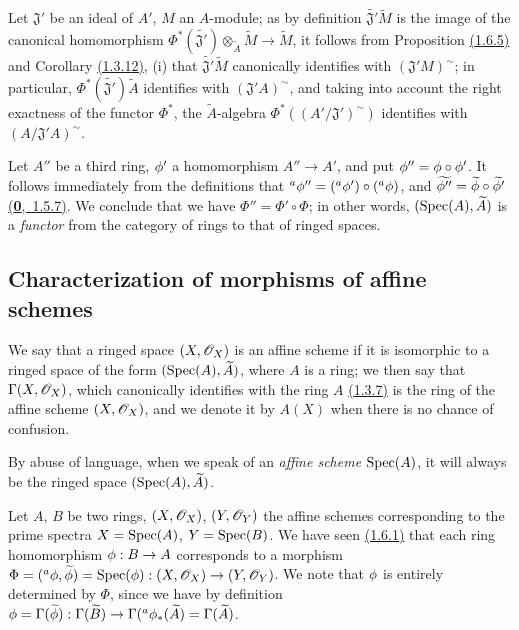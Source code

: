 \begin{env}[1.6.9]
\label{env-1.1.6.9}
Let $\mathfrak{J}'$ be an ideal of $A'$, $M$ an $A$-module; as by definition
$\widetilde{\mathfrak{J}'}\widetilde{M}$ is the image of the canonical homomorphism
$\Phi^*(\widetilde{\mathfrak{J}'})\otimes_{\widetilde{A}}\widetilde{M}\to\widetilde{M}$, it
follows from Proposition \hyperref[prop-1.1.6.5]{(1.6.5)} and
Corollary \hyperref[cor-1.1.3.12]{(1.3.12)}, (i) that
$\widetilde{\mathfrak{J}'}\widetilde{M}$ canonically identifies with $(\mathfrak{J}' M)^\sim$;
in particular, $\Phi^*(\widetilde{\mathfrak{J}'})\widetilde{A}$ identifies with
$(\mathfrak{J}' A)^\sim$, and taking into account the right exactness of the functor $\Phi^*$,
the $\widetilde{A}$-algebra $\Phi^*((A'/\mathfrak{J}')^\sim)$ identifies with
$(A/\mathfrak{J}' A)^\sim$.
\end{env}

\begin{env}[1.6.10]
\label{env-1.1.6.10}
Let $A''$ be a third ring, $\phi'$ a homomorphism $A''\to A'$, and put
$\phi''=\phi\circ\phi'$. It follows immediately from the definitions that
${}^a\phi''=({}^a\phi')\circ({}^a\phi)$, and
$\widetilde{\phi''}=\widetilde{\phi}\circ\widetilde{\phi'}$ \hyperref[env-0.1.5.7]{(\textbf{0},~1.5.7)}. We conclude
that we have $\Phi''=\Phi'\circ\Phi$; in other words, $({\mathop{\mathrm{Spec}}\nolimits}(A),\widetilde{A})$ is a
{\it functor} from the category of rings to that of ringed spaces.
\end{env}

\subsection{Characterization of morphisms of affine schemes}
\label{subsection-morphisms-affine-schemes}

\begin{defn}[1.7.1]
\label{defn-1.1.7.1}
We say that a ringed space $(X,\mathscr{O}_X)$ is an affine scheme if it is isomorphic to a ringed
space of the form $({\mathop{\mathrm{Spec}}\nolimits}(A),\widetilde{A})$, where $A$ is a ring; we then say that
$\Gamma(X,\mathscr{O}_X)$, which canonically identifies with the ring $A$ \hyperref[thm-1.1.3.7]{(1.3.7)} is the
ring of the affine scheme $(X,\mathscr{O}_X)$, and we denote it by $A(X)$ when there is no chance of
confusion.
\end{defn}

By abuse of language, when we speak of an {\it affine scheme ${\mathop{\mathrm{Spec}}\nolimits}(A)$}, it will always be
the ringed space $({\mathop{\mathrm{Spec}}\nolimits}(A),\widetilde{A})$.

\begin{env}[1.7.2]
\label{env-1.1.7.2}
Let $A$, $B$ be two rings, $(X,\mathscr{O}_X)$, $(Y,\mathscr{O}_Y)$ the affine schemes corresponding to
the prime spectra $X={\mathop{\mathrm{Spec}}\nolimits}(A)$, $Y={\mathop{\mathrm{Spec}}\nolimits}(B)$. We have seen \hyperref[env-1.1.6.1]{(1.6.1)} that each ring
homomorphism $\phi:B\to A$ corresponds to a morphism
$\Phi=({}^a\phi,\widetilde{\phi})={\mathop{\mathrm{Spec}}\nolimits}(\phi):(X,\mathscr{O}_X)\to(Y,\mathscr{O}_Y)$. We note that $\phi$
is entirely determined by $\Phi$, since we have by definition
$\phi=\Gamma(\widetilde{\phi}):\Gamma(\widetilde{B})
\to\Gamma({}^a\phi_*(\widetilde{A})=\Gamma(\widetilde{A})$.
\end{env}

